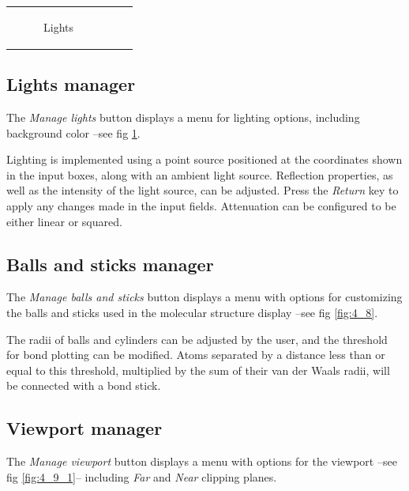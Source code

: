 \documentclass[10pt]{article}
\begin{document}
\begin{tabular}{lcr}
\begin{minipage}{.45\linewidth}
\begin{figure}[H]
\begin{center}
        \end{center}
        \vspace*{1mm}
        \caption{Lights \label{fig:4_7}}
    \end{figure}
\end{minipage}
\end{tabular}

\subsection{Lights manager \label{sec:4.7}}

The {\it Manage lights} button displays a menu for lighting options,  
including background color  
--see fig \ref{fig:4_7}.  

Lighting is implemented using a point source positioned at the coordinates  
shown in the input boxes, along with an ambient light source.  
Reflection properties, as well as the intensity of the light source,  
can be adjusted. Press the {\it Return} key to apply any changes made in the input fields.  
Attenuation can be configured to be either linear or squared.  


\subsection{Balls and sticks manager \label{sec:4.8}}

The {\it Manage balls and sticks} button displays a menu with options  
for customizing the balls and sticks used in the molecular structure display --see fig \ref{fig:4_8}.  

The radii of balls and cylinders can be adjusted by the user, and the threshold for  
bond plotting can be modified. Atoms separated by a distance less than or equal to  
this threshold, multiplied by the sum of their van der Waals radii,  
will be connected with a bond stick.  


\subsection{Viewport manager \label{sec:4.9}}

The {\it Manage viewport} button displays a menu with 
options for the viewport --see fig \ref{fig:4_9_1}-- 
including {\it Far} and {\it Near} clipping planes.  
\end{document}
